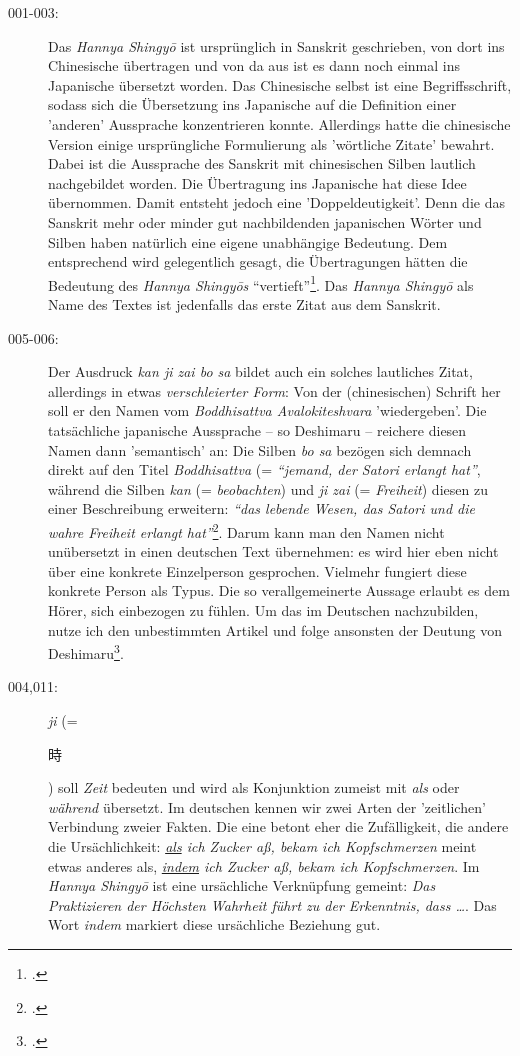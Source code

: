 \documentclass[
DIV=calc,
BCOR=5mm,
11pt,
headings=small,
oneside,
bibtotocnumbered,
english,ngerman]{scrartcl}
\newcommand{\cnbsmi}[1]{\begin{CJK}{UTF8}{bsmi}#1\end{CJK}}
\begin{document}
\begin{description}

  \item[001-003:] Das \emph{Hannya Shingyō} ist ursprünglich in Sanskrit
  geschrieben, von dort ins Chinesische übertragen und von da aus ist es dann
  noch einmal ins Japanische übersetzt worden. Das Chinesische selbst ist eine
  Begriffsschrift, sodass sich die Übersetzung ins Japanische auf die Definition
  einer 'anderen' Aussprache konzentrieren konnte. Allerdings hatte die
  chinesische Version einige ursprüngliche Formulierung als 'wörtliche Zitate'
  bewahrt. Dabei ist die Aussprache des Sanskrit mit chinesischen Silben
  lautlich nachgebildet worden. Die Übertragung ins Japanische hat diese Idee
  übernommen. Damit entsteht jedoch eine 'Doppeldeutigkeit'. Denn die das
  Sanskrit mehr oder minder gut nachbildenden japanischen Wörter und Silben
  haben natürlich eine eigene unabhängige Bedeutung. Dem entsprechend wird
  gelegentlich gesagt, die Übertragungen hätten die Bedeutung des \emph{Hannya
  Shingyōs} \enquote{vertieft}\footcite[vgl.][56]{Deshimaru1988a}. Das
  \emph{Hannya Shingyō} als Name des Textes ist jedenfalls das erste Zitat aus
  dem Sanskrit.

  \item[005-006:] Der Ausdruck \emph{kan ji zai bo sa} bildet auch ein solches
  lautliches Zitat, allerdings in etwas \emph{verschleierter Form}: Von der
  (chinesischen) Schrift her soll er den Namen vom \emph{Boddhisattva
  Avalokiteshvara} 'wiedergeben'. Die tatsächliche japanische Aussprache -- so
  Deshimaru -- reichere diesen Namen dann 'semantisch' an: Die Silben \emph{bo
  sa} bezögen sich demnach direkt auf den Titel \emph{Boddhisattva} (=
  \emph{\enquote{jemand, der Satori erlangt hat}}, während die Silben \emph{kan}
  (= \emph{beobachten}) und \emph{ji zai} (= \emph{Freiheit}) diesen zu einer
  Beschreibung erweitern: \emph{\enquote{das lebende Wesen, das Satori und die
  wahre Freiheit erlangt hat}}\footcite[vgl.][57]{Deshimaru1988a}. Darum kann
  man den Namen nicht unübersetzt in einen deutschen Text übernehmen: es wird
  hier eben nicht über eine konkrete Einzelperson gesprochen. Vielmehr fungiert
  diese konkrete Person als Typus. Die so verallgemeinerte Aussage erlaubt es
  dem Hörer, sich einbezogen zu fühlen. Um das im Deutschen nachzubilden, nutze
  ich den unbestimmten Artikel und folge ansonsten der Deutung von
  Deshimaru\footcite[vgl.][57 et passim]{Deshimaru1988a}.

  \item[004,011:] \emph{ji} (= \cnbsmi{時}) soll \emph{Zeit} bedeuten und wird
  als Konjunktion zumeist mit \emph{als} oder \emph{während} übersetzt. Im
  deutschen kennen wir zwei Arten der 'zeitlichen' Verbindung zweier Fakten. Die
  eine betont eher die Zufälligkeit, die andere die Ursächlichkeit:
  \emph{\underline{als} ich Zucker aß, bekam ich Kopfschmerzen} meint etwas
  anderes als, \emph{\underline{indem} ich Zucker aß, bekam ich Kopfschmerzen}.
  Im \emph{Hannya Shingyō} ist eine ursächliche Verknüpfung gemeint: \emph{Das
  Praktizieren der Höchsten Wahrheit führt zu der Erkenntnis, dass \ldots}. Das
  Wort \emph{indem} markiert diese ursächliche Beziehung gut.


\end{description}
\end{document}
